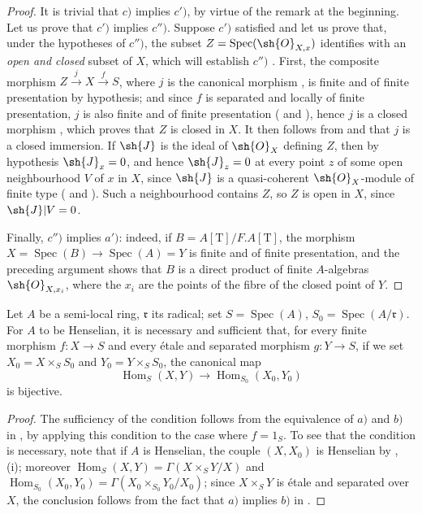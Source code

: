 \begin{proof}
It is trivial that $c)$ implies $c')$, by virtue of the remark at the beginning.
Let us prove that $c')$ implies $c'')$.
Suppose $c')$ satisfied and let us prove that, under the hypotheses of $c'')$, the subset $Z=\operatorname{Spec}(\sh{O}_{X,x})$ identifies with an \emph{open and closed} subset of $X$, which will establish $c'')$ .
First, the composite morphism $Z\xrightarrow{j}X\xrightarrow{f}S$, where $j$ is the canonical morphism , is finite and of finite presentation by hypothesis;
and since $f$ is separated and locally of finite presentation, $j$ is also finite and of finite presentation ( and ), hence $j$ is a closed morphism , which proves that $Z$ is closed in $X$.
It then follows from  and  that $j$ is a closed immersion.
If $\sh{J}$ is the ideal of $\sh{O}_X$ defining $Z$, then by hypothesis $\sh{J}_x=0$, and hence $\sh{J}_z=0$ at every point $z$ of some open neighbourhood $V$ of $x$ in $X$, since $\sh{J}$ is a quasi-coherent $\sh{O}_X$-module of finite type ( and ).
Such a neighbourhood contains $Z$, so $Z$ is open in $X$, since $\sh{J}|V=0$.

Finally, $c'')$ implies $a')$:
indeed, if $B=A[\mathrm{T}]/F.A[\mathrm{T}]$, the morphism $X=\operatorname{Spec}(B)\to\operatorname{Spec}(A)=Y$ is finite and of finite presentation, and the preceding argument shows that $B$ is a direct product of finite $A$-algebras $\sh{O}_{X,x_i}$, where the $x_i$ are the points of the fibre of the closed point of $Y$.
\end{proof}

\begin{corollary}[18.5.12]
\label{IV.18.5.12}
Let $A$ be a semi-local ring, $\mathfrak{r}$ its radical;
set $S=\operatorname{Spec}(A)$, $S_0=\operatorname{Spec}(A/\mathfrak{r})$.
For $A$ to be Henselian, it is necessary and sufficient that, for every finite morphism $f:X\to S$ and every \'etale and separated morphism $g:Y\to S$, if we set $X_0=X\times_S S_0$ and $Y_0=Y\times_S S_0$, the canonical map
\[
\operatorname{Hom}_S(X,Y)\to\operatorname{Hom}_{S_0}(X_0,Y_0)
\]
is bijective.
\end{corollary}

\begin{proof}
The sufficiency of the condition follows from the equivalence of $a)$ and $b)$ in , by applying this condition to the case where $f=1_S$.
To see that the condition is necessary, note that if $A$ is Henselian, the couple $(X,X_0)$ is Henselian by , (i);
moreover $\operatorname{Hom}_S(X,Y)=\Gamma(X\times_S Y/X)$ and $\operatorname{Hom}_{S_0}(X_0,Y_0)=\Gamma(X_0\times_{S_0}Y_0/X_0)$;
since $X\times_S Y$ is \'etale and separated over $X$, the conclusion follows from the fact that $a)$ implies $b)$ in .
\end{proof}

